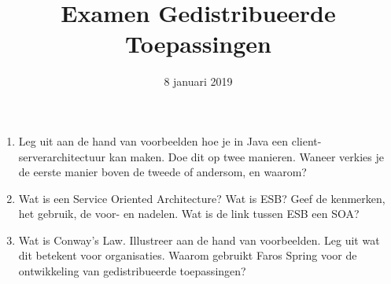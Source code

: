 \documentclass{article}
\begin{document}
\title{Examen Gedistribueerde Toepassingen}
\date{8 januari 2019}
\author{}
\maketitle

\begin{enumerate}
    \item Leg uit aan de hand van voorbeelden hoe je in Java een client-serverarchitectuur kan maken. Doe dit op twee manieren. Waneer verkies je de eerste manier boven de tweede of andersom, en waarom?
    \item Wat is een Service Oriented Architecture? Wat is ESB? Geef de kenmerken, het gebruik, de voor- en nadelen. Wat is de link tussen ESB een SOA?
    \item Wat is Conway's Law. Illustreer aan de hand van voorbeelden. Leg uit wat dit betekent voor organisaties. Waarom gebruikt Faros Spring voor de ontwikkeling van gedistribueerde toepassingen?
\end{enumerate}
	
    
\end{document}
